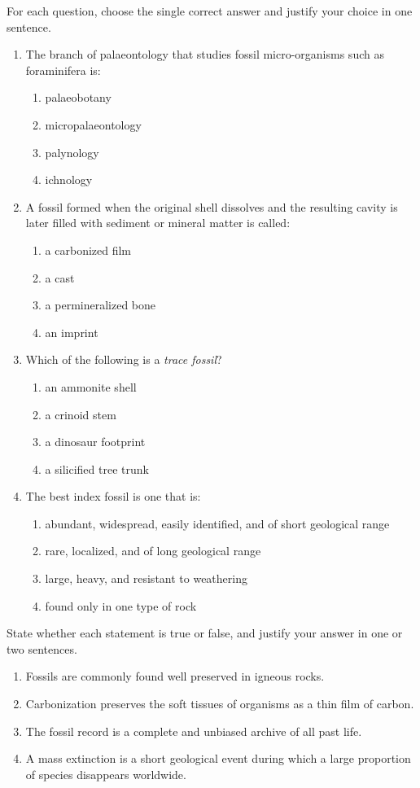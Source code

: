 \documentclass[11pt]{article}
\begin{document}
\begin{exercice}
For each question, choose the single correct answer and justify your choice in one sentence.
\begin{enumerate}
\item The branch of palaeontology that studies fossil micro-organisms such as foraminifera is:
\begin{enumerate}
\item palaeobotany \item micropalaeontology \item palynology \item ichnology
\end{enumerate}
\item A fossil formed when the original shell dissolves and the resulting cavity is later filled with sediment or mineral matter is called:
\begin{enumerate}
\item a carbonized film \item a cast \item a permineralized bone \item an imprint
\end{enumerate}
\item Which of the following is a \emph{trace fossil}?
\begin{enumerate}
\item an ammonite shell \item a crinoid stem \item a dinosaur footprint \item a silicified tree trunk
\end{enumerate}
\item The best index fossil is one that is:
\begin{enumerate}
\item abundant, widespread, easily identified, and of short geological range
\item rare, localized, and of long geological range
\item large, heavy, and resistant to weathering
\item found only in one type of rock
\end{enumerate}
\end{enumerate}
\end{exercice}

\begin{exercice}
State whether each statement is true or false, and justify your answer in one or two sentences.
\begin{enumerate}
\item Fossils are commonly found well preserved in igneous rocks.
\item Carbonization preserves the soft tissues of organisms as a thin film of carbon.
\item The fossil record is a complete and unbiased archive of all past life.
\item A mass extinction is a short geological event during which a large proportion of species disappears worldwide.
\end{enumerate}
\end{exercice}
\end{document}
